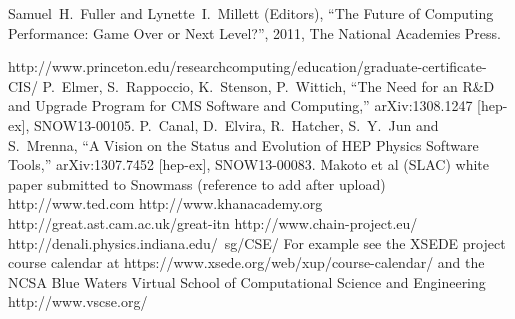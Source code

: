 \begin{thebibliography}{99}



 Samuel~H.~Fuller and Lynette~I.~Millett (Editors),
  ``The Future of Computing Performance:  Game Over or Next Level?'', 
  2011,
  The National Academies Press.

 http://www.princeton.edu/researchcomputing/education/graduate-certificate-CIS/
 P.~Elmer, S.~Rappoccio, K.~Stenson, P.~Wittich, 
  ``The Need for an R\&D and Upgrade Program for CMS Software and Computing,'' 
  arXiv:1308.1247 [hep-ex], SNOW13-00105.
  P.~Canal, D.~Elvira, R.~Hatcher, S.~Y.~Jun and S.~Mrenna,
  ``A Vision on the Status and Evolution of HEP Physics Software Tools,''
  arXiv:1307.7452 [hep-ex], SNOW13-00083.
 Makoto et al (SLAC) white paper submitted to Snowmass (reference to add after upload)
 http://www.ted.com
 http://www.khanacademy.org
 http://great.ast.cam.ac.uk/great-itn
 http://www.chain-project.eu/
 http://denali.physics.indiana.edu/~sg/CSE/ 
 For example see the XSEDE project course calendar at https://www.xsede.org/web/xup/course-calendar/ and the NCSA Blue Waters Virtual School of Computational Science and Engineering http://www.vscse.org/ 


\end{thebibliography}
















